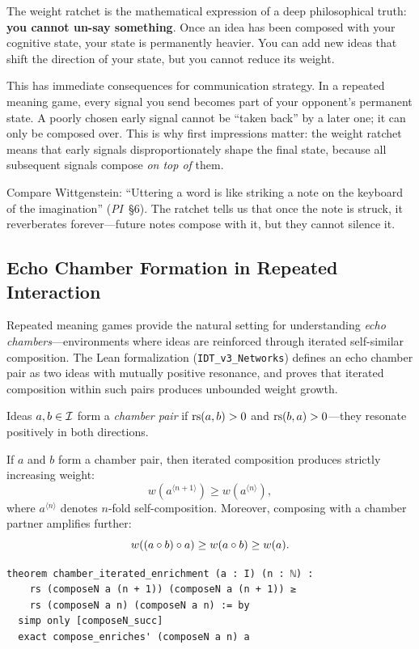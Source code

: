 \begin{interpretation}
\label{interp:irreversibility}
The weight ratchet is the mathematical expression of a deep philosophical
truth: \textbf{you cannot un-say something}.  Once an idea has been composed
with your cognitive state, your state is permanently heavier.  You can add
new ideas that shift the direction of your state, but you cannot reduce its
weight.

This has immediate consequences for communication strategy.  In a repeated
meaning game, every signal you send becomes part of your opponent's permanent
state.  A poorly chosen early signal cannot be ``taken back'' by a later one;
it can only be composed over.  This is why first impressions matter: the
weight ratchet means that early signals disproportionately shape the final
state, because all subsequent signals compose \emph{on top of} them.

Compare Wittgenstein: ``Uttering a word is like striking a note on the
keyboard of the imagination'' (\emph{PI}~\S6).  The ratchet tells us that
once the note is struck, it reverberates forever---future notes compose with
it, but they cannot silence it.
\end{interpretation}


\subsection{Echo Chamber Formation in Repeated Interaction}

Repeated meaning games provide the natural setting for understanding
\emph{echo chambers}---environments where ideas are reinforced through
iterated self-similar composition.  The Lean formalization
(\texttt{IDT\_v3\_Networks}) defines an echo chamber pair as two ideas
with mutually positive resonance, and proves that iterated composition within
such pairs produces unbounded weight growth.

\begin{definition}
\label{def:chamber-pair}
Ideas $a, b \in \mathcal{I}$ form a \emph{chamber pair} if
$\mathrm{rs}(a, b) > 0$ and $\mathrm{rs}(b, a) > 0$---they resonate positively in both
directions.
\end{definition}

\begin{theorem}
\label{thm:chamber-amplification}
If $a$ and $b$ form a chamber pair, then iterated composition produces
strictly increasing weight:
\[
  w\!\left(a^{\langle n+1 \rangle}\right) \geq w\!\left(a^{\langle n \rangle}\right),
\]
where $a^{\langle n \rangle}$ denotes $n$-fold self-composition.  Moreover,
composing with a chamber partner amplifies further:
\[
  w\!\left((a \circ b) \circ a\right) \geq w(a \circ b) \geq w(a).
\]

\begin{lstlisting}[caption={Lean 4: Chamber iterated enrichment}]
theorem chamber_iterated_enrichment (a : I) (n : ℕ) :
    rs (composeN a (n + 1)) (composeN a (n + 1)) ≥
    rs (composeN a n) (composeN a n) := by
  simp only [composeN_succ]
  exact compose_enriches' (composeN a n) a
\end{lstlisting}
\end{theorem}

